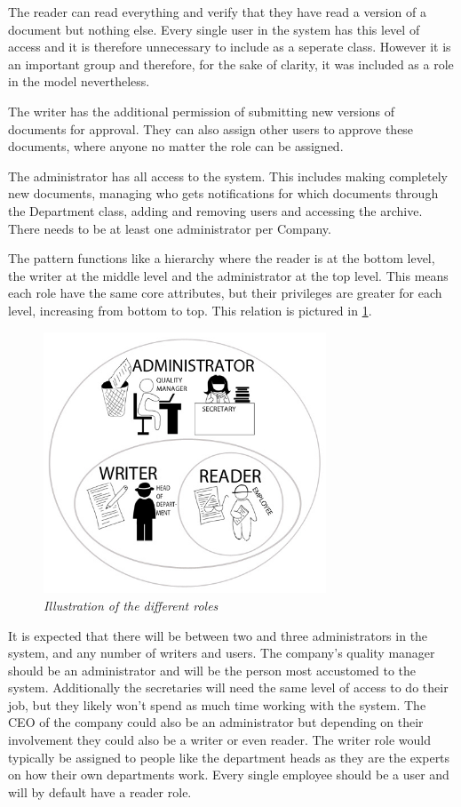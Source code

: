 The reader can read everything and verify that they have read a version of a document but nothing else.
Every single user in the system has this level of access and it is therefore unnecessary to include as a seperate class.
However it is an important group and therefore, for the sake of clarity, it was included as a role in the model nevertheless.

The writer has the additional permission of submitting new versions of documents for approval. They can also assign other users to approve these documents, where anyone no matter the role can be assigned.

The administrator has all access to the system.
This includes making completely new documents, managing who gets notifications for which documents through the Department class, adding and removing users and accessing the archive.
There needs to be at least one administrator per Company.

The pattern functions like a hierarchy where the reader is at the bottom level, the writer at the middle level and the administrator at the top level. This means each role have the same core attributes, but their privileges are greater for each level, increasing from bottom to top.
This relation is pictured in \cref{fig:RoleIllustration}.

\begin{figure}[H]
	\centering
	\includegraphics[width=0.75\textwidth]{billeder/RP-Roller2.jpg}
	\caption{\textit{Illustration of the different roles
	}\label{fig:RoleIllustration}}
\end{figure}

It is expected that there will be between two and three administrators in the system, and any number of writers and users.
The company's quality manager should be an administrator and will be the person most accustomed to the system.
Additionally the secretaries will need the same level of access to do their job, but they likely won't spend as much time working with the system.
The CEO of the company could also be an administrator but depending on their involvement they could also be a writer or even reader.
The writer role would typically be assigned to people like the department heads as they are the experts on how their own departments work.
Every single employee should be a user and will by default have a reader role.

